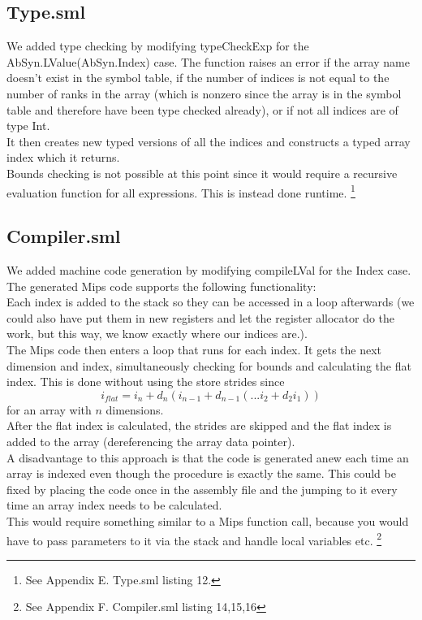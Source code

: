\documentclass[12pt,a4paper,english]{article}
\begin{document}
\subsection{Type.sml}
We added type checking by modifying typeCheckExp for the AbSyn.LValue(AbSyn.Index) case. The function raises an error if the array name doesn't exist in the symbol table, if the number of indices is not equal to the number of ranks in the array (which is nonzero since the array is in the symbol table and therefore have been type checked already), or if not all indices are of type Int. \\
It then creates new typed versions of all the indices and constructs a typed array index which it returns. \\
Bounds checking is not possible at this point since it would require a recursive evaluation function for all expressions. This is instead done runtime.
\footnote{See Appendix E. Type.sml listing 12.}

\subsection{Compiler.sml}
We added machine code generation by modifying compileLVal for the Index case. The generated Mips code supports the following functionality: \\
Each index is added to the stack so they can be accessed in a loop afterwards (we could also have put them in new registers and let the register allocator do the work, but this way, we know exactly where our indices are.). \\ 
The Mips code then enters a loop that runs for each index. It gets the next dimension and index, simultaneously checking for bounds and calculating the flat index. This is done without using the store strides since
\[i_{flat} = i_n + d_n(i_{n-1} + d_{n-1}(... i_2 + d_2i_1))\]
for an array with $n$ dimensions. \\
After the flat index is calculated, the strides are skipped and the flat index is added to the array (dereferencing the array data pointer). \\

A disadvantage to this approach is that the code is generated anew each time an array is indexed even though the procedure is exactly the same. This could be fixed by placing the code once in the assembly file and the jumping to it every time an array index needs to be calculated. \\
This would require something similar to a Mips function call, because you would have to pass parameters to it via the stack and handle local variables etc. 
\footnote{See Appendix F. Compiler.sml listing 14,15,16}
\end{document}
